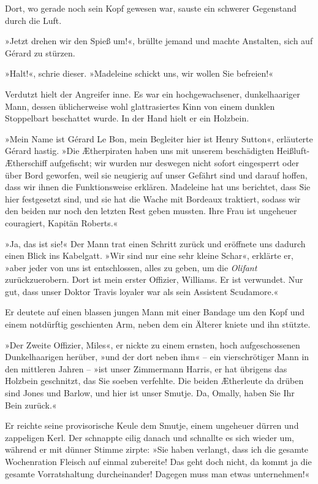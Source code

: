 Dort, wo gerade noch sein Kopf gewesen war, sauste ein schwerer
Gegenstand durch die Luft.

»Jetzt drehen wir den Spieß um!«, brüllte jemand und machte
Anstalten, sich auf Gérard zu stürzen.

»Halt!«, schrie dieser. »Madeleine schickt uns, wir wollen Sie
befreien!«

Verdutzt hielt der Angreifer inne. Es war ein hochgewachsener,
dunkelhaariger Mann, dessen üblicherweise wohl glattrasiertes Kinn
von einem dunklen Stoppelbart beschattet wurde. In der Hand hielt
er ein Holzbein.

»Mein Name ist Gérard Le Bon, mein Begleiter hier ist Henry
Sutton«, erläuterte Gérard hastig. »Die Ætherpiraten haben uns mit
unserem beschädigten Heißluft-Ætherschiff aufgefischt; wir wurden
nur deswegen nicht sofort eingesperrt oder über Bord geworfen, weil
sie neugierig auf unser Gefährt sind und darauf hoffen, dass wir
ihnen die Funktionsweise erklären. Madeleine hat uns berichtet,
dass Sie hier festgesetzt sind, und sie hat die Wache mit Bordeaux
traktiert, sodass wir den beiden nur noch den letzten Rest geben
mussten. Ihre Frau ist ungeheuer couragiert, Kapitän Roberts.«

»Ja, das ist sie!« Der Mann trat einen Schritt zurück und eröffnete
uns dadurch einen Blick ins Kabelgatt. »Wir sind nur eine sehr
kleine Schar«, erklärte er, »aber jeder von uns ist entschlossen,
alles zu geben, um die \emph{Olifant} zurückzuerobern. Dort ist
mein erster Offizier, Williams. Er ist verwundet. Nur gut, dass
unser Doktor Travis loyaler war als sein Assistent Scudamore.«

Er deutete auf einen blassen jungen Mann mit einer Bandage um den
Kopf und einem notdürftig geschienten Arm, neben dem ein Älterer
kniete und ihn stützte.

»Der Zweite Offizier, Miles«, er nickte zu einem ernsten, hoch
aufgeschossenen Dunkelhaarigen herüber, »und der dort neben ihm« –
ein vierschrötiger Mann in den mittleren Jahren – »ist unser
Zimmermann Harris, er hat übrigens das Holzbein geschnitzt, das Sie
soeben verfehlte. Die beiden Ætherleute da drüben sind Jones und
Barlow, und hier ist unser Smutje. Da, Omally, haben Sie Ihr Bein
zurück.«

Er reichte seine provisorische Keule dem Smutje, einem ungeheuer
dürren und zappeligen Kerl. Der schnappte eilig danach und
schnallte es sich wieder um, während er mit dünner Stimme zirpte:
»Sie haben verlangt, dass ich die gesamte Wochenration Fleisch auf
einmal zubereite! Das geht doch nicht, da kommt ja die gesamte
Vorratshaltung durcheinander! Dagegen muss man etwas unternehmen!«

